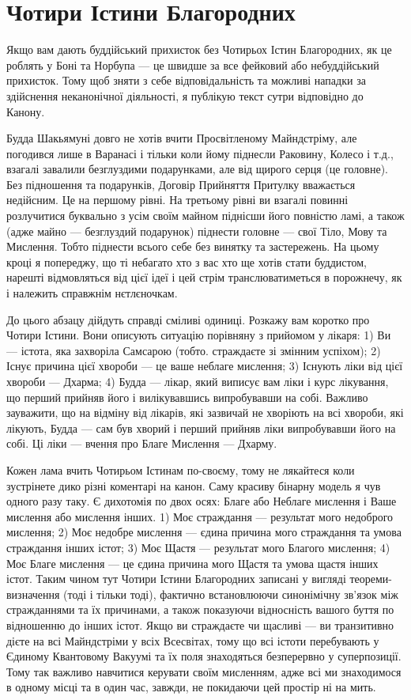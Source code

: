 \section{Чотири Істини Благородних}

Якщо вам дають буддійський прихисток без Чотирьох Істин Благородних,
як це роблять у Боні та Норбупа — це швидше за все фейковий або
небуддійський прихисток. Тому щоб зняти з себе відповідальність
та можливі нападки за здійснення неканонічної діяльності,
я публікую текст сутри відповідно до Канону.

Будда Шакьямуні довго не хотів вчити Просвітленому Майндстріму,
але погодився лише в Варанасі і тільки коли йому піднесли Раковину,
Колесо і т.д., взагалі завалили безглуздими подарунками,
але від щирого серця (це головне). Без підношення та подарунків,
Договір Прийняття Притулку вважається недійсним. Це на
першому рівні. На третьому рівні ви взагалі повинні розлучитися
буквально з усім своїм майном піднісши його повністю ламі,
а також (адже майно --- безглуздий подарунок) піднести
головне --- свої Тіло, Мову та Мислення. Тобто піднести всього
себе без винятку та застережень. На цьому кроці я попереджу, що
ті небагато хто з вас хто ще хотів стати буддистом, нарешті відмовляться
від цієї ідеї і цей стрім транслюватиметься в порожнечу, як і
належить справжнім нєтлєночкам.

До цього абзацу дійдуть справді сміливі одиниці. Розкажу вам
коротко про Чотири Істини. Вони описують ситуацію порівняну
з прийомом у лікаря: 1) Ви --- істота, яка захворіла Самсарою (тобто.
страждаєте зі змінним успіхом); 2) Існує причина цієї
хвороби --- це ваше неблаге мислення; 3) Існують ліки
від цієї хвороби --- Дхарма; 4) Будда --- лікар, який виписує
вам ліки і курс лікування, що перший прийняв його і вилікувавшись
випробувавши на собі. Важливо зауважити, що на відміну від лікарів,
які зазвичай не хворіють на всі хвороби, які лікують,
Будда --- сам був хворий і перший прийняв ліки випробувавши
його на собі. Ці ліки — вчення про Благе Мислення --- Дхарму.

Кожен лама вчить Чотирьом Істинам по-своєму, тому не лякайтеся
коли зустрінете дико різні коментарі на канон. Саму
красиву бінарну модель я чув одного разу таку. Є дихотомія
по двох осях: Благе або Неблаге мислення і Ваше мислення або
мислення інших. 1) Моє страждання --- результат мого недоброго
мислення; 2) Моє недобре мислення --- єдина причина
мого страждання та умова страждання інших істот; 3)
Моє Щастя --- результат мого Благого мислення; 4) Моє
Благе мислення --- це єдина причина мого Щастя
та умова щастя інших істот. Таким чином тут
Чотири Істини Благородних записані у вигляді теореми-визначення
(тоді і тільки тоді), фактично встановлюючи синонімічну
зв'язок між стражданнями та їх причинами, а також показуючи
відносність вашого буття по відношенню до інших істот.
Якщо ви страждаєте чи щасливі --- ви транзитивно дієте
на всі Майндстріми у всіх Всесвітах, тому що всі істоти
перебувають у Єдиному Квантовому Вакуумі та їх поля знаходяться
безперервно у суперпозиції. Тому так важливо навчитися керувати
своїм мисленням, адже всі ми знаходимося в одному місці та в один
час, завжди, не покидаючи цей простір ні на мить.

